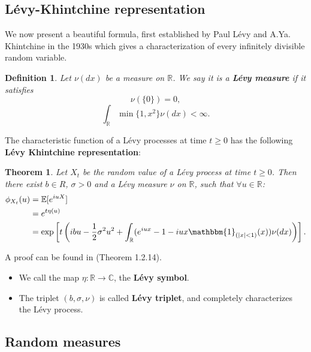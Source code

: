 \documentclass[a4paper,10pt]{article}
\newcommand{\numberset}{\mathbb}
\newcommand{\R}{\numberset{R}}
\newcommand{\C}{\numberset{C}}
\newtheorem{Theorem}{Theorem}[section]
\newtheorem{Definition}{Definition}[section]
\begin{document}
\subsection{Lévy-Khintchine representation}

We now present a beautiful formula, first established by Paul Lévy and A.Ya. Khintchine in the 1930s
which gives a characterization of every infinitely divisible random variable.\\

\begin{Definition} \label{Levy_measure}
Let $\nu(dx)$ be a measure on $\R$. We say it is a \textbf{Lévy measure} if it satisfies
\begin{equation}
 \nu (\{ 0 \} ) = 0,
\end{equation}
\begin{equation} \label{Levy_m}
 \int_{\R} \min\{1, x^2\} \nu(dx) < \infty.
\end{equation}
\end{Definition}
The characteristic function of a Lévy processes at time $t\geq 0$ has the following \textbf{Lévy Khintchine representation}:
\begin{Theorem}
 Let $X_t$ be the random value of a Lévy process at time $t\geq0$. Then there exist $b\in R$, $\sigma>0$
 and a Lévy measure $\nu$ on $\R$, such that $\forall u \in \R$:
\begin{align}
\phi_{X_t}(u)  &= \mathbb{E} [e^{iuX}] \\ 
	     &= e^{t \eta(u)} \nonumber \\
	     &= \exp \left[ t \left( ibu - \frac{1}{2} \sigma^2 u^2 + \int_{\R} 
	         ( e^{iux} -1 -iux \mathbbm{1}_{(|x|<1)}(x) ) \nu(dx) \right) \right]. \nonumber		      
\end{align}
\end{Theorem}
A proof can be found in \cite{Applebaum} (Theorem 1.2.14).\\

\begin{itemize}
 \item We call the map $\eta : \R \to \C$, the \textbf{Lévy symbol}.
 \item The triplet $(b, \sigma, \nu)$ is called \textbf{Lévy triplet}, and completely characterizes the Lévy process.
\end{itemize}





\subsection{Random measures}\label{random_measures}
\end{document}

